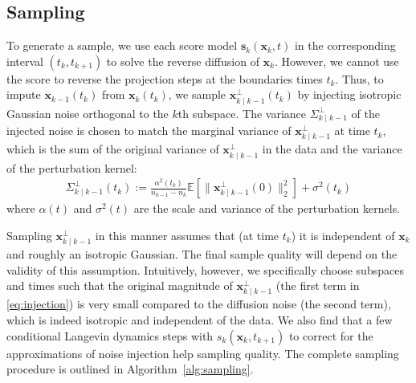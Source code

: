 \documentclass{article}
\begin{document}
\subsection{Sampling} \label{sec:sampling}

To generate a sample, we use each score model $\mathbf{s}_k(\mathbf{x}_k, t)$ in the corresponding interval $(t_k, t_{k+1})$ to solve the reverse diffusion of $\mathbf{x}_k$. However, we cannot use the score to reverse the projection steps at the boundaries times $t_k$. Thus, to impute $\mathbf{x}_{k-1}(t_{k})$ from $\mathbf{x}_{k}(t_{k})$, we sample $\mathbf{x}^\perp_{k \mid k-1}(t_k)$ by injecting isotropic Gaussian noise orthogonal to the $k$th subspace. The variance $\Sigma^\perp_{k\mid k-1}$ of the injected noise is chosen to match the marginal variance of $\mathbf{x}^\perp_{k \mid k-1}$ at time $t_k$, which is the sum of the original variance of $\mathbf{x}^\perp_{k \mid k-1}$ in the data and the variance of the perturbation kernel:
\begin{equation} \label{eq:injection}
\begin{aligned}
    \Sigma^\perp_{k \mid k-1}(t_{k}) := \frac{\alpha^2(t_k)}{n_{k-1} - n_{k}} \mathbb{E}\left[ \lVert \mathbf{x}^\perp_{k\mid k-1}(0) \rVert^2_2 \right] + \sigma^2(t_k)
\end{aligned}
\end{equation}
where $\alpha(t)$ and $\sigma^2(t)$ are the scale and variance of the perturbation kernels.

Sampling $\mathbf{x}^\perp_{k\mid k-1}$ in this manner assumes that (at time $t_k$) it is independent of $\mathbf{x}_{k}$ and roughly an isotropic Gaussian. The final sample quality will depend on the validity of this assumption. Intuitively, however, we specifically choose subspaces and times such that the original magnitude of $\mathbf{x}_{k\mid k-1}^\perp$ (the first term in \eqref{eq:injection}) is very small compared to the diffusion noise (the second term), which is indeed isotropic and independent of the data. We also find that a few conditional Langevin dynamics steps with $s_{k}(\mathbf{x}_k, t_{k+1})$ to correct for the approximations of noise injection help sampling quality. The complete sampling procedure is outlined in Algorithm~\ref{alg:sampling}.
\end{document}
